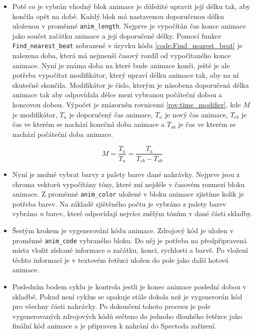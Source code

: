 \begin{itemize}
    \item Poté co je vybrán vhodný blok animace je důležité upravit její délku tak, aby končila opět na době. Každý blok má nastavenou doporučenou délku uloženou v proměnné \texttt{anim\_length}. Nejprve je vypočítán čas konce animace jako součet začátku animace a její doporučené délky. Pomocí funkce \texttt{Find\_nearest\_beat} zobrazené v úryvku kódu \ref{code:Find_nearest_beat} je nalezena doba, která má nejmenší časový rozdíl od vypočítaného konce animace. Nyní je známa doba na které bude animace konči, ještě je ale potřeba vypočítat modifikátor, který upraví délku animace tak, aby na ní skutečně skončila. Modifikátor je číslo, kterým je násobena doporučená délka animace tak aby odpovídala délce mezi vybranou počáteční dobou a koncovou dobou. Výpočet je znázorněn rovnicemi \ref{rov:time_modifier}, kde $M$ je modifikátor, $T_a$ je doporučený čas animace, $T_n$ je nový čas animace, $T_{eb}$ je čas ve kterém se nachází konečná doba animace a $T_{sb}$ je čas ve kterém se nachází počáteční doba animace.
    
    \begin{equation}
        M = \frac{T_a}{T_n} = \frac{T_a}{T_{eb} - T_{sb}}
        \label{rov:time_modifier}
    \end{equation}
    
    \item Nyní je možné vybrat barvy z palety barev dané nahrávky. Nejprve jsou z chroma vektorů vypočítány tóny, které zní nejdéle v časovém rozmezí bloku animace. Z proměnné \texttt{anim\_color} uložené v bloku animace zjistíme kolik je potřeba barev. Na základě zjištěného počtu je vybráno z palety barev vybráno \textit{n} barev, které odpovídají nejvíce znělým tónům v dané části skladby. 

    \item Šestým krokem je vygenerování kódu animace. Zdrojový kód je uložen v proměnné \texttt{anim\_code} vybraného bloku. Do něj je potřeba na předpřipravená místa vložit získané informace o začátku, konci, rychlosti a barvě. Po vložení těchto informací je v textovém řetězci uložen do pole jako další hotová animace. 
    
    \item Posledním bodem cyklu je kontrola jestli je konec animace poslední dobou v skladbě. Pokud není cyklus se opakuje stále dokola než je vygenerován kód pro všechny části nahrávky. Po dokončení tohoto procesu je pole vygenerovaných zdrojových kódů sečteno do jednoho dlouhého řetězce jako finální kód animace a je připraven k nahrání do Spectoda zařízení. 
    
\end{itemize}


